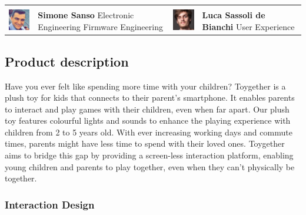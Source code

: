 \begin{tabular}{m{2cm}m{5cm}m{2cm}m{5cm}}
     & & & \\
    
    \includegraphics[width=2cm]{images/icon_simone.png} & \textbf{Simone Sanso} \newline Electronic Engineering \newline Firmware Engineering &
    \includegraphics[width=2cm]{images/icon_luca.png} & \textbf{Luca Sassoli de Bianchi} \newline User Experience\\
\end{tabular}

\subsection{Product description}
Have you ever felt like spending more time with your children? Toygether is a plush toy for kids that connects to their parent’s smartphone. It enables parents to interact and play games with their children, even when far apart. Our plush toy features colourful lights and sounds to enhance the playing experience with children from 2 to 5 years old. With ever increasing working days and commute times, parents might have less time to spend with their loved ones. Toygether aims to bridge this gap by providing a screen-less interaction platform, enabling young children and parents to play together, even when they can’t physically be together.

\subsubsection{Interaction Design}
\label{sec:interaction_design}

